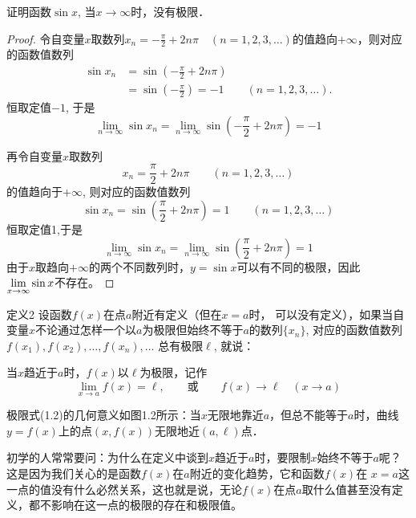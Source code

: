 \begin{example}
证明函数$\sin x$, 当$x\to\infty$时，没有极限．
\end{example}

\begin{proof}
令自变量$x$取数列$x_n=-\frac{\pi}{2}+2n\pi\quad (n=1,2,3,\ldots)$的值趋向$+\infty$，则对应的函数值数列
\[\begin{split}
    \sin x_n&=\sin\left(-\frac{\pi}{2}+2n\pi\right)\\
&=\sin\left(-\frac{\pi}{2}\right) =-1 \qquad (n=1, 2, 3, \ldots) .
\end{split}\]
恒取定值$-1$, 于是
\[\lim_{n\to\infty} \sin x_n=\lim_{n\to\infty} \sin \left(-\frac{\pi}{2}+2n\pi\right)=-1\]

再令自变量$x$取数列
\[x_n=\frac{\pi}{2}+2n\pi\qquad  (n=1, 2, 3, \ldots )\]
的值趋向于$+\infty$, 则对应的函数值数列
\[\sin x_n =\sin\left(\frac{\pi}{2}+2n\pi\right) =1\qquad  (n=1, 2, 3, \ldots)\]
恒取定值1,于是
\[\lim_{n\to\infty} \sin x_n=\lim_{n\to\infty} \sin\left(\frac{\pi}{2}+2n\pi\right) =1\]
由于$x$取趋向$+\infty$的两个不同数列时，$y=\sin x$可以有不同的极限，因此
$\displaystyle\lim_{x\to\infty} \sin x$不存在。
\end{proof}

\begin{blk}{定义2}
 设函数$f(x)$在点$a$附近有定义（但在$x=a$时，
可以没有定义），如果当自变量$x$不论通过怎样一个以$a$为极限但始终不等于$a$的数列$\{x_n\}$, 对应的函数值数列$f (x_1) ,f (x_2) , \ldots,f(x_n ) ,\ldots$
总有极限$\ell$, 就说：

当$x$趋近于$a$时，$f(x)$以$\ell$为极限，记作
\begin{equation}
   \lim_{x\to a}f(x)=\ell,\qquad \text{或}\qquad f(x)\to \ell\quad (x\to a) 
\end{equation}
\end{blk}

极限式(1.2)的几何意义如图1.2所示：当$x$无限地靠近$a$，但总不能等于$a$时，曲线$y=f(x)$上的点$(x,f(x))$无限地近$(a,\ell)$点．

\begin{figure}[htp]
    \centering
    
    \caption{}
\end{figure}

初学的人常常要问：为什么在定义中谈到$x$趋近于$a$时，要限制$x$始终不等于$a$呢？这是因为我们关心的是函数$f(x)$在$a$附近的变化趋势，它和函数$f(x)$在
$x=a$这一点的值没有什么必然关系，这也就是说，无论$f(x)$在点$a$取什么值甚至没有定义，都不影响在这一点的极限的存在和极限值。

